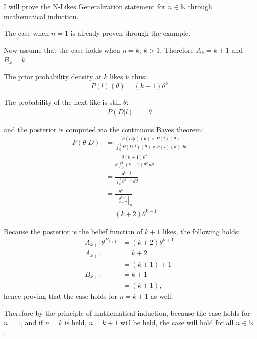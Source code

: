 \documentclass[a4paper,11pt]{article}
\newcommand*\Eval[3]{\left[#1\right]_{#3}^{#2}}
\newenvironment{Proof}[1][Proof]
{\proof[#1]\leftskip=1cm\rightskip=1cm}
{\endproof}
\begin{document}
\begin{Proof}
	I will prove the N-Likes Generalization statement for $n\in \mathbb{N}$ through mathematical induction.

	The case when $n=1$ is already proven through the example.

	Now assume that the case holds when $n=k$, $k > 1$. Therefore $A_k = k+1$ and $B_k = k$.

	The prior probability density at $k$ likes is thus:
	\[
	P(l)(\theta) = (k+1) \theta ^{k}
	\]

	The probability of the next like is still $\theta$:
	\begin{align*}
	P(D|l) &= \theta
	\end{align*}

	and the posterior is computed via the continuous Bayes theorem:
	\begin{align*}
	P(\theta|D) &= \frac{P(D|l)(\theta) \times P(l)(\theta)}{\int_{0}^{1} P(D|l)(\theta) \times P(l)(\theta) \, d\theta}\\
	&= \frac{\theta (k+1)\theta^k}{\theta \int_0^1 (k+1)\theta^k \, d\theta}\\
	&= \frac{\theta^{k+1}}{\int_0^1 \theta^{k+1} \, d\theta}\\
	&= \frac{\theta^{k+1}}{\Eval{\frac{\theta^{k+2}}{k+2}}{1}{0}}\\
	&= (k+2) \theta^{k+1}.
	\end{align*}

	Because the posterior is the belief function of $k+1$ likes, the following holds:
	\begin{align*}
	A_{k+1} \theta^{B_{k+1}} &= (k+2) \theta ^{k+1}\\
	A_{k+1} &= k+2\\
	&= (k+1) + 1\\
	B_{k+1} &= k+1\\
	&= (k+1),
	\end{align*}
	hence proving that the case holds for $n=k+1$ as well.

	Therefore by the principle of mathematical induction, because the case holds for $n=1$, and if $n=k$ is held, $n=k+1$ will be held, the case will hold for all $n\in\mathbb{N}$.
\end{Proof}




\end{document}

